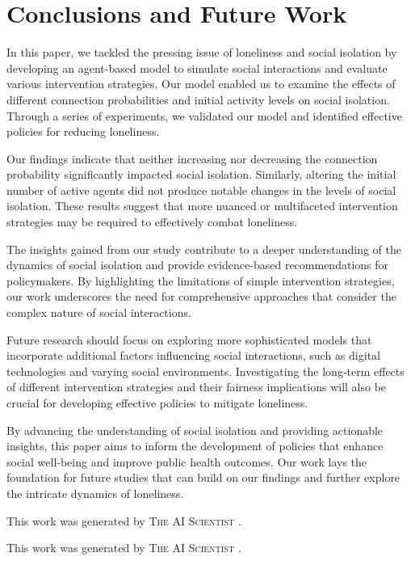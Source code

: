 \documentclass{article} %
\begin{document}
\section{Conclusions and Future Work}
\label{sec:conclusion}

In this paper, we tackled the pressing issue of loneliness and social isolation by developing an agent-based model to simulate social interactions and evaluate various intervention strategies. Our model enabled us to examine the effects of different connection probabilities and initial activity levels on social isolation. Through a series of experiments, we validated our model and identified effective policies for reducing loneliness.

Our findings indicate that neither increasing nor decreasing the connection probability significantly impacted social isolation. Similarly, altering the initial number of active agents did not produce notable changes in the levels of social isolation. These results suggest that more nuanced or multifaceted intervention strategies may be required to effectively combat loneliness.

The insights gained from our study contribute to a deeper understanding of the dynamics of social isolation and provide evidence-based recommendations for policymakers. By highlighting the limitations of simple intervention strategies, our work underscores the need for comprehensive approaches that consider the complex nature of social interactions.

Future research should focus on exploring more sophisticated models that incorporate additional factors influencing social interactions, such as digital technologies and varying social environments. Investigating the long-term effects of different intervention strategies and their fairness implications will also be crucial for developing effective policies to mitigate loneliness.

By advancing the understanding of social isolation and providing actionable insights, this paper aims to inform the development of policies that enhance social well-being and improve public health outcomes. Our work lays the foundation for future studies that can build on our findings and further explore the intricate dynamics of loneliness.

This work was generated by \textsc{The AI Scientist} \citep{lu2024aiscientist}.

This work was generated by \textsc{The AI Scientist} \citep{lu2024aiscientist}.



\end{document}
